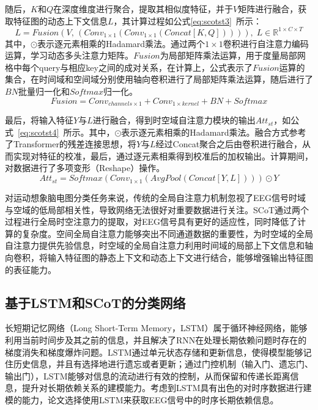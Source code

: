 随后，\(K\)和\(Q\)在深度维度进行聚合，提取其相似度特征，并于\(V\)矩阵进行融合，获取特征图的动态上下文信息\(L\)，其计算过程如公式\ref{eq:scotst3}~所示：
\begin{equation}\label{eq:scotst3}
    L=Fusion(V ,\, (Conv_{1 \times 1}(Conv_{1 \times 1}(Concat[K,Q])))),\;L \in \mathbb{R}^{1 \times C \times T}
\end{equation}
其中，\(\odot\)表示逐元素相乘的Hadamard乘法。通过两个\(1 \times 1\)卷积进行自注意力编码运算，学习动态多头注意力矩阵。\(Fusion\)为局部矩阵乘法运算，用于度量局部网格中每个query与相应key之间的成对关系，在计算上，公式表示了\(Fusion\)运算的集合，在时间域和空间域分别使用轴向卷积进行了局部矩阵乘法运算，随后进行了\(BN\)批量归一化和\(Softmax\)归一化。
\begin{equation}\label{eq:scotst4}
    Fusion=Conv_{channels \times 1}+Conv_{1 \times kernel} + BN + Softmax
\end{equation}

最后，将输入特征\(Y\)与\(L\)进行融合，得到时空域自注意力模块的输出\(Att_{st}\)，如公式~\ref{eq:scotst4}~所示。其中，\(\odot\)表示逐元素相乘的Hadamard乘法。融合方式参考了Transformer的残差连接思想，将\(Y\)与\(L\)经过Concat聚合之后由卷积进行融合，从而实现对特征的校准，最后，通过逐元素相乘得到校准后的加权输出。计算期间，对数据进行了多项变形（Reshape）操作。
\begin{equation}\label{eq:scotst5}
    Att_{st}=Softmax(Conv_{1 \times 1}(AvgPool(Concat[Y,L]))) \odot Y
\end{equation}

对运动想象脑电图分类任务来说，传统的全局自注意力机制忽视了EEG信号时域与空域的低局部相关性，导致网络无法很好对重要数据进行关注。SCoT通过两个过程进行全局时空注意力的提取，对EEG信号具有更好的适应性，同时降低了计算的复杂度。空间全局自注意力能够突出不同通道数据的重要性，为时空域的全局自注意力提供先验信息，时空域的全局自注意力利用时间域的局部上下文信息和轴向卷积，将输入特征图的静态上下文和动态上下文进行结合，能够增强输出特征图的表征能力。

\subsection{基于LSTM和SCoT的分类网络}

长短期记忆网络（Long Short-Term Memory，LSTM）属于循环神经网络，能够利用当前时间步及其之前的信息，并且解决了RNN在处理长期依赖问题时存在的梯度消失和梯度爆炸问题。LSTM通过单元状态存储和更新信息，使得模型能够记住历史信息，并且有选择地进行遗忘或者更新；通过门控机制（输入门、遗忘门、输出门），LSTM能够对信息的流动进行有效的控制，从而保留和传递长距离信息，提升对长期依赖关系的建模能力。考虑到LSTM具有出色的对时序数据进行建模的能力，论文选择使用LSTM来获取EEG信号中的时序长期依赖信息。

